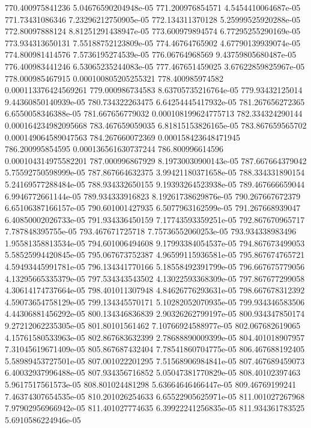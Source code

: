 {770.400975841236 5.04676590204948e-05
771.200976854571 4.5454410064687e-05
771.73431086346 7.23296212750905e-05
772.134311370128 5.25999525920288e-05
772.80097888124 8.81251291438947e-05
773.600979894574 6.77295255290169e-05
773.934313650131 7.55188752123809e-05
774.46764765902 4.67790139939074e-05
774.800981414576 7.5736195274539e-05
776.06764968569 9.43759805680487e-05
776.400983441246 6.53065235244083e-05
777.467651459025 3.67622859825967e-05
778.000985467915 0.000100805205255321
778.400985974582 0.000113376424569261
779.000986734583 8.63705735216764e-05
779.93432125014 9.44360850140939e-05
780.734322263475 6.64254445417932e-05
781.267656272365 6.6550058346388e-05
781.667656779032 0.000108199624775713
782.334324290144 0.000164234982095668
783.467659059035 6.81815153826165e-05
783.867659565702 0.000149064589047563
784.267660072369 0.000158423648471945
786.200995854595 0.000136561630737244
786.800996614596 0.000104314975582201
787.000996867929 8.19730030900143e-05
787.667664379042 5.75592750598999e-05
787.867664632375 3.99421180371658e-05
788.334331890154 5.24169577288484e-05
788.934332650155 9.19393264523938e-05
789.467666659044 6.9946772661144e-05
789.934333916823 8.19261738629876e-05
790.267667672379 6.65106387166157e-05
790.601001427935 6.5077963162599e-05
791.267668939047 6.40850002026733e-05
791.934336450159 7.17743593359251e-05
792.867670965717 7.787848395755e-05
793.467671725718 7.75736552060253e-05
793.934338983496 1.95581358813534e-05
794.601006494608 9.17993384054537e-05
794.867673499053 5.58525994420845e-05
795.067673752387 4.96599115936581e-05
795.867674765721 4.59493445991781e-05
796.134341770166 5.18558492391799e-05
796.667675779056 4.13295665335379e-05
797.534343543502 4.13022593368309e-05
797.867677299058 4.30614174737664e-05
798.401011307948 4.84626776293631e-05
798.667678312392 4.59073654758129e-05
799.134345570171 5.10282052070935e-05
799.934346583506 4.44306881456292e-05
800.134346836839 2.90326262799197e-05
800.934347850174 9.27212062235305e-05
801.80101561462 7.10766924588977e-05
802.067682619065 4.15761580533963e-05
802.867683632399 2.78688890009399e-05
804.401018907957 7.31045619671409e-05
805.867687432404 7.78541860704775e-05
806.467688192405 5.58989453727501e-05
807.001022201295 7.51568906984841e-05
807.467689459073 6.40032937996488e-05
807.934356716852 5.05047381770829e-05
808.40102397463 5.9617517561573e-05
808.801024481298 5.63664646466447e-05
809.46769199241 7.46374307654535e-05
810.201026254633 6.65522905625971e-05
811.001027267968 7.97902956966942e-05
811.401027774635 6.39922241256835e-05
811.934361783525 5.6910586224946e-05
}
